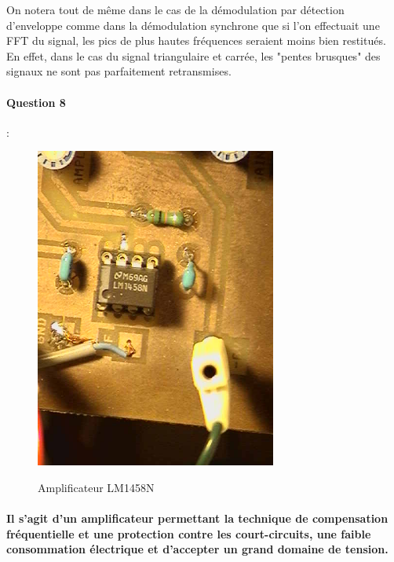 \documentclass[french]{article}
\begin{document}
On notera tout de même dans le cas de la démodulation par détection d'enveloppe comme dans la démodulation synchrone que si l'on effectuait une FFT du signal, les pics de plus hautes fréquences seraient moins bien restitués. En effet, dans le cas du signal triangulaire et carrée, les "pentes brusques" des signaux ne sont pas parfaitement retransmises.
\newpage
\paragraph{Question 8} : \\
\begin{figure}[!h]
\includegraphics[height=400px]{question8.jpg}\\
\caption{Amplificateur LM1458N}
\end{figure}
\paragraph{Il s'agit d'un amplificateur permettant la technique de compensation fréquentielle et une protection contre les court-circuits, une faible consommation électrique et d'accepter un grand domaine de tension. }

\newpage
\end{document}
